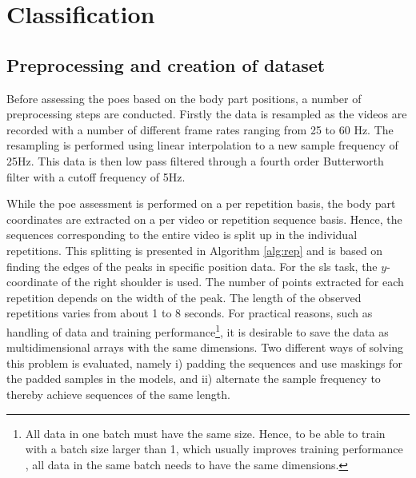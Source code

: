 \section{Classification} \label{sec:met-class}

\subsection{Preprocessing and creation of dataset} \label{sec:met-class-preproc}
Before assessing the \glspl{poe} based on the body part positions, a number of preprocessing steps are conducted. Firstly the data is resampled as the videos are recorded with a number of different frame rates ranging from 25 to 60 Hz. The resampling is performed using linear interpolation to a new sample frequency of 25Hz. This data is then low pass filtered through a fourth order Butterworth filter with a cutoff frequency of 5Hz. %

While the \gls{poe} assessment is performed on a per repetition basis, the body part coordinates are extracted on a per video or repetition sequence basis. Hence, the sequences corresponding to the entire video is split up in the individual repetitions. This splitting is presented in Algorithm \ref{alg:rep} and is based on finding the edges of the peaks in specific position data. For the \gls{sls} task, the $y$-coordinate of the right shoulder is used. The number of points extracted for each repetition depends on the width of the peak. The length of the observed repetitions varies from about 1 to 8 seconds. For practical reasons, such as handling of data and training performance\footnote{All data in one batch must have the same size. Hence, to be able to train with a batch size larger than 1, which usually improves training performance \cite{Goodfellow2016}, all data in the same batch needs to have the same dimensions.}, it is desirable to save the data as multidimensional arrays with the same dimensions. Two different ways of solving this problem is evaluated, namely i) padding the sequences and use maskings for the padded samples in the models, and ii) alternate the sample frequency to thereby achieve sequences of the same length.

